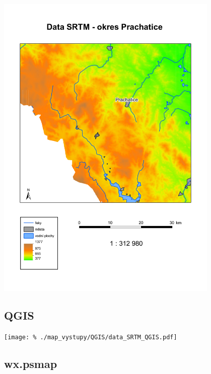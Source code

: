 \documentclass[a4paper,12pt,draft]{article}
\begin{document}
\begin{center}
\includegraphics[width=0.8\textwidth]{./map_vystupy/ArcGIS/data_SRTM_ArcGIS.pdf}
\end{center}

\newpage
\subsection{QGIS}
\label{priloha:vystupy:qgis}

\begin{center}

\texttt{[image: \%
./map\_vystupy/QGIS/data\_SRTM\_QGIS.pdf]}
\end{center}



\newpage
\subsection{wx.psmap}
\label{priloha:vystupy:psmap}
\end{document}
